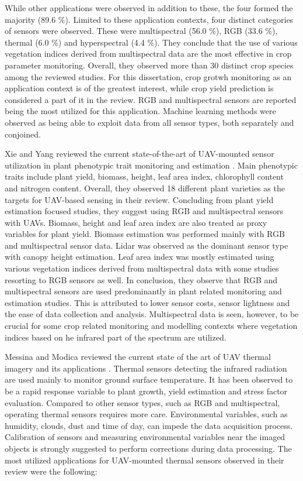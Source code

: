 While other applications were observed in addition to these, the four formed the majority (89.6 \%). Limited to these application contexts, four distinct categories of sensors were observed. These were multispectral (56.0 \%), RGB (33.6 \%), thermal (6.0 \%)  and hyperspectral (4.4 \%). They conclude that the use of various vegetation indices derived from multispectral data are the most effective in crop parameter monitoring. Overall, they observed more than 30 distinct crop species among the reviewed studies. For this dissertation, crop grotwh monitoring as an application context is of the greatest interest, while crop yield prediction is considered a part of it in the review. RGB and multispectral sensors are reported being the most utilized for this application. Machine learning methods were observed as being able to exploit data from all sensor types, both separately and conjoined. 

Xie and Yang reviewed the current state-of-the-art of UAV-mounted sensor utilization in plant phenotypic trait monitoring and estimation \cite{Xie2020}. Main phenotypic traits include plant yield, biomass, height, leaf area index, chlorophyll content and nitrogen content. Overall, they observed 18 different plant varieties as the targets for UAV-based sensing in their review. Concluding from plant yield estimation focused studies, they suggest using RGB and multispectral sensors with UAVs. Biomass, height and leaf area index are also treated as proxy variables for plant yield. Biomass estimation was performed mainly with RGB and multispectral sensor data. Lidar was observed as the dominant sensor type with canopy height estimation. Leaf area index was mostly estimated using various vegetation indices derived from multispectral data with some studies resorting to RGB sensors as well. In conclusion, they observe that RGB and multispectral sensors are used predominantly in plant related monitoring and estimation studies. This is attributed to lower sensor costs, sensor lightness and the ease of data collection and analysis. Multispectral data is seen, however, to be crucial for some crop related monitoring and modelling contexts where vegetation indices based on he infrared part of the spectrum are utilized.

Messina and Modica reviewed the current state of the art of UAV thermal imagery and its applications \cite{Messina2020}. Thermal sensors detecting the infrared radiation are used mainly to monitor ground surface temperature. It has been observed to be a rapid response variable to plant growth, yield estimation and stress factor evaluation. Compared to other sensor types, such as RGB and multispectral, operating thermal sensors requires more care. Environmental variables, such as humidity, clouds, dust and time of day, can impede the data acquisition process. Calibration of sensors and measuring environmental variables near the imaged objects is strongly suggested to perform corrections during data processing. The most utilized applications for UAV-mounted thermal sensors observed in their review were the following:

